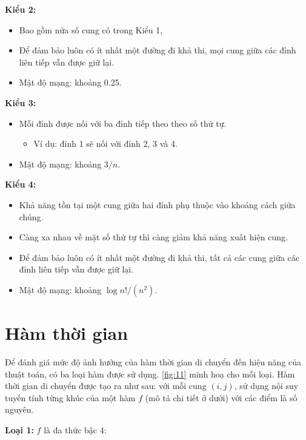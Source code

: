 \documentclass[../main.tex]{subfiles}
\begin{document}
\textbf{Kiểu 2:}

\begin{itemize}
\tightlist
\item
  Bao gồm nửa số cung có trong Kiểu 1,
\item
  Để đảm bảo luôn có ít nhất một đường đi khả thi, mọi cung giữa các
  đỉnh liên tiếp vẫn được giữ lại.
\item
  Mật độ mạng: khoảng 0.25.
\end{itemize}

\textbf{Kiểu 3:}

\begin{itemize}
\tightlist
\item
  Mỗi đỉnh được nối với ba đỉnh tiếp theo theo số thứ tự.

  \begin{itemize}
  \tightlist
  \item
    Ví dụ: đỉnh 1 sẽ nối với đỉnh 2, 3 và 4.
  \end{itemize}
\item
  Mật độ mạng: khoảng \(3/n\).
\end{itemize}

\textbf{Kiểu 4:}

\begin{itemize}
\tightlist
\item
  Khả năng tồn tại một cung giữa hai đỉnh phụ thuộc vào khoảng cách giữa
  chúng.
\item
  Càng xa nhau về mặt số thứ tự thì càng giảm khả năng xuất hiện cung.
\item
  Để đảm bảo luôn có ít nhất một đường đi khả thi, tất cả các cung giữa
  các đỉnh liên tiếp vẫn được giữ lại.
\item
  Mật độ mạng: khoảng \(\log n!/(n^2)\).
\end{itemize}

\section{Hàm thời gian}\label{huxe0m-thux1eddi-gian}

Để đánh giá mức độ ảnh hưởng của hàm thời gian di chuyển đến hiệu năng
của thuật toán, có ba loại hàm được sử dụng. \autoref{fig:11} minh hoạ cho mỗi
loại. Hàm thời gian di chuyển được tạo ra như sau: với mỗi cung
\((i,j)\), sử dụng nội suy tuyến tính từng khúc của một hàm \(f\) (mô tả
chi tiết ở dưới) với các điểm là số nguyên.

\textbf{Loại 1:} \(f\) là đa thức bậc 4:
\end{document}
